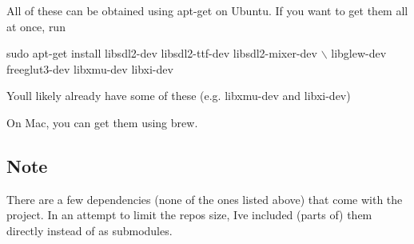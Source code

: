 All of these can be obtained using {\ttfamily apt-\/get} on Ubuntu. If you want to get them all at once, run


\begin{DoxyCode}
sudo apt-get install libsdl2-dev libsdl2-ttf-dev libsdl2-mixer-dev \(\backslash\)
    libglew-dev freeglut3-dev libxmu-dev libxi-dev
\end{DoxyCode}
 You\textquotesingle{}ll likely already have some of these (e.\+g. libxmu-\/dev and libxi-\/dev)

On Mac, you can get them using {\ttfamily brew}.

\subsection*{Note}

There are a few dependencies (none of the ones listed above) that come with the project. In an attempt to limit the repo\textquotesingle{}s size, I\textquotesingle{}ve included (parts of) them directly instead of as submodules. 